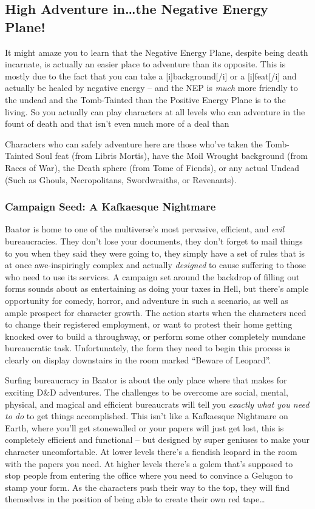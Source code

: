 \subsection{High Adventure in\ldots the Negative Energy Plane!}

It might amaze you to learn that the Negative Energy Plane, despite being death incarnate, is actually an easier place to adventure than its opposite. This is mostly due to the fact that you can take a [i]background[/i] or a [i]feat[/i] and actually be healed by negative energy -- and the NEP is \emph{much} more friendly to the undead and the Tomb-Tainted than the Positive Energy Plane is to the living. So you actually can play characters at all levels who can adventure in the fount of death and that isn't even much more of a deal than 

Characters who can safely adventure here are those who've taken the Tomb-Tainted Soul feat (from Libris Mortis), have the Moil Wrought background (from Races of War), the Death sphere (from Tome of Fiends), or any actual Undead (Such as Ghouls, Necropolitans, Swordwraiths, or Revenants).

\subsubsection{Campaign Seed: A Kafkaesque Nightmare}

Baator is home to one of the multiverse's most pervasive, efficient, and \textit{evil} bureaucracies. They don't lose your documents, they don't forget to mail things to you when they said they were going to, they simply have a set of rules that is at once awe-inspiringly complex and actually \textit{designed} to cause suffering to those who need to use its services. A campaign set around the backdrop of filling out forms sounds about as entertaining as doing your taxes in Hell, but there's ample opportunity for comedy, horror, and adventure in such a scenario, as well as ample prospect for character growth. The action starts when the characters need to change their registered employment, or want to protest their home getting knocked over to build a throughway, or perform some other completely mundane bureaucratic task. Unfortunately, the form they need to begin this process is clearly on display downstairs in the room marked ``Beware of Leopard''.

Surfing bureaucracy in Baator is about the only place where that makes for exciting D\&D adventures. The challenges to be overcome are social, mental, physical, and magical and efficient bureaucrats will tell you \textit{exactly what you need to do} to get things accomplished. This isn't like a Kafkaesque Nightmare on Earth, where you'll get stonewalled or your papers will just get lost, this is completely efficient and functional -- but designed by super geniuses to make your character uncomfortable. At lower levels there's a fiendish leopard in the room with the papers you need. At higher levels there's a golem that's supposed to stop people from entering the office where you need to convince a Gelugon to stamp your form. As the characters push their way to the top, they will find themselves in the position of being able to create their own red tape\ldots

